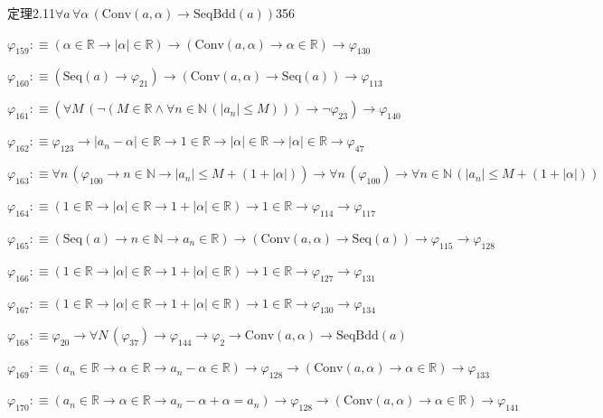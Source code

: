 \begin{fullproof}{定理2.11}{$\forall a\,\forall \alpha\,(\mathrm{Conv}(a,\alpha) \to \mathrm{SeqBdd}(a))$}{356}
\begin{abbrevlist}
\item $\varphi_{159} :\equiv (\alpha \in \mathbb{R} \to \lvert \alpha \rvert \in \mathbb{R}) \to (\mathrm{Conv}(a,\alpha) \to \alpha \in \mathbb{R}) \to \varphi_{130}$
\item $\varphi_{160} :\equiv (\mathrm{Seq}(a) \to \varphi_{21}) \to (\mathrm{Conv}(a,\alpha) \to \mathrm{Seq}(a)) \to \varphi_{113}$
\item $\varphi_{161} :\equiv (\forall M\,(\neg (M \in \mathbb{R} \land \forall n \in \mathbb{N}\,(\lvert a_{n} \rvert \leq M))) \to \neg \varphi_{23}) \to \varphi_{140}$
\item $\varphi_{162} :\equiv \varphi_{123} \to \lvert a_{n} - \alpha \rvert \in \mathbb{R} \to 1 \in \mathbb{R} \to \lvert \alpha \rvert \in \mathbb{R} \to \lvert \alpha \rvert \in \mathbb{R} \to \varphi_{47}$
\item $\varphi_{163} :\equiv \forall n\,(\varphi_{100} \to n \in \mathbb{N} \to \lvert a_{n} \rvert \leq M + (1 + \lvert \alpha \rvert)) \to \forall n\,(\varphi_{100}) \to \forall n \in \mathbb{N}\,(\lvert a_{n} \rvert \leq M + (1 + \lvert \alpha \rvert))$
\item $\varphi_{164} :\equiv (1 \in \mathbb{R} \to \lvert \alpha \rvert \in \mathbb{R} \to 1 + \lvert \alpha \rvert \in \mathbb{R}) \to 1 \in \mathbb{R} \to \varphi_{114} \to \varphi_{117}$
\item $\varphi_{165} :\equiv (\mathrm{Seq}(a) \to n \in \mathbb{N} \to a_{n} \in \mathbb{R}) \to (\mathrm{Conv}(a,\alpha) \to \mathrm{Seq}(a)) \to \varphi_{115} \to \varphi_{128}$
\item $\varphi_{166} :\equiv (1 \in \mathbb{R} \to \lvert \alpha \rvert \in \mathbb{R} \to 1 + \lvert \alpha \rvert \in \mathbb{R}) \to 1 \in \mathbb{R} \to \varphi_{127} \to \varphi_{131}$
\item $\varphi_{167} :\equiv (1 \in \mathbb{R} \to \lvert \alpha \rvert \in \mathbb{R} \to 1 + \lvert \alpha \rvert \in \mathbb{R}) \to 1 \in \mathbb{R} \to \varphi_{130} \to \varphi_{134}$
\item $\varphi_{168} :\equiv \varphi_{20} \to \forall N\,(\varphi_{37}) \to \varphi_{144} \to \varphi_{2} \to \mathrm{Conv}(a,\alpha) \to \mathrm{SeqBdd}(a)$
\item $\varphi_{169} :\equiv (a_{n} \in \mathbb{R} \to \alpha \in \mathbb{R} \to a_{n} - \alpha \in \mathbb{R}) \to \varphi_{128} \to (\mathrm{Conv}(a,\alpha) \to \alpha \in \mathbb{R}) \to \varphi_{133}$
\item $\varphi_{170} :\equiv (a_{n} \in \mathbb{R} \to \alpha \in \mathbb{R} \to a_{n} - \alpha + \alpha = a_{n}) \to \varphi_{128} \to (\mathrm{Conv}(a,\alpha) \to \alpha \in \mathbb{R}) \to \varphi_{141}$

\end{abbrevlist}
\end{fullproof}
